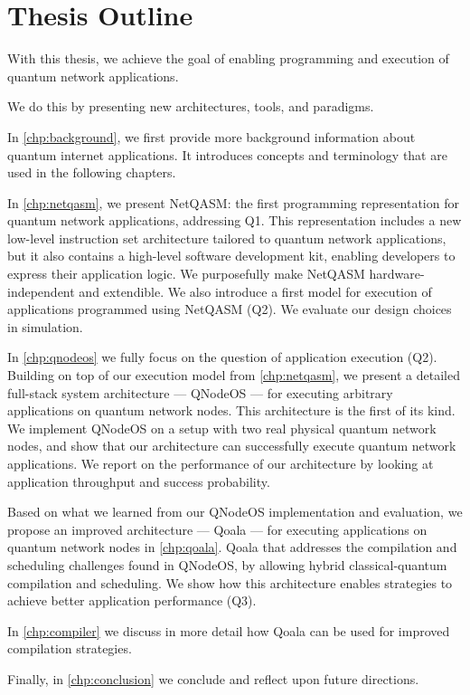 \section{Thesis Outline}
With this thesis, we achieve the goal of enabling programming and execution of quantum network applications.

We do this by presenting new architectures, tools, and paradigms.

In \cref{chp:background}, we first provide more background information about quantum internet applications.
It introduces concepts and terminology that are used in the following chapters.

In \cref{chp:netqasm}, we present NetQASM: the first programming representation for quantum network applications, addressing Q1.
This representation includes a new low-level instruction set architecture tailored to quantum network applications,
but it also contains a high-level software development kit, enabling developers to express their application logic.
We purposefully make NetQASM hardware-independent and extendible.
We also introduce a first model for execution of applications programmed using NetQASM (Q2).
We evaluate our design choices in simulation.

In \cref{chp:qnodeos} we fully focus on the question of application execution (Q2).
Building on top of our execution model from \cref{chp:netqasm}, we present a detailed full-stack system architecture --- QNodeOS --- for executing arbitrary applications on quantum network nodes.
This architecture is the first of its kind.
We implement QNodeOS on a setup with two real physical quantum network nodes, and show that our architecture can successfully execute quantum network applications.
We report on the performance of our architecture by looking at application throughput and success probability.


Based on what we learned from our QNodeOS implementation and evaluation, we propose an improved architecture --- Qoala --- for executing applications on quantum network nodes in \cref{chp:qoala}.
Qoala that addresses the compilation and scheduling challenges found in QNodeOS, by allowing hybrid classical-quantum compilation and scheduling.
We show how this architecture enables strategies to achieve better application performance (Q3).

In \cref{chp:compiler} we discuss in more detail how Qoala can be used for improved compilation strategies.

Finally, in \cref{chp:conclusion} we conclude and reflect upon future directions.


